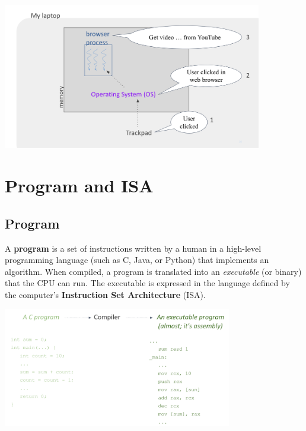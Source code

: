 \documentclass[../../compsys.tex]{subfiles}
\begin{document}
\begin{center}
  \includegraphics[width=0.85\textwidth]{chapters/L1/images/os_youtube.png}
\end{center}

\newpage
\section{Program and ISA}
\subsection{Program}
A \textbf{program} is a set of instructions written by a human in a high-level programming language (such as C, Java, or Python) that implements an algorithm. When compiled, a program is translated into an \emph{executable} (or binary) that the CPU can run. The executable is expressed in the language defined by the computer's \textbf{Instruction Set Architecture} (ISA).

\begin{center}
  \includegraphics[width=0.75\textwidth]{chapters/L1/images/program.png}
\end{center}
\end{document}
